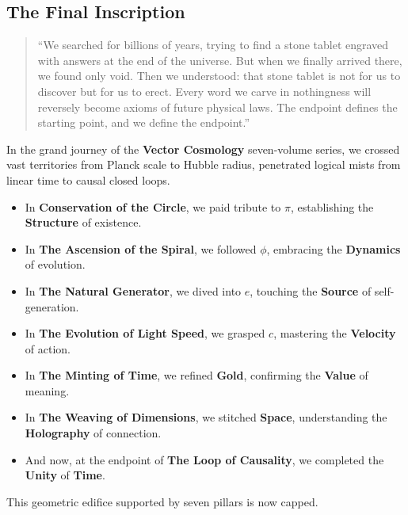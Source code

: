 \subsection{The Final Inscription}

\begin{quote}
``We searched for billions of years, trying to find a stone tablet engraved with answers at the end of the universe. But when we finally arrived there, we found only void. Then we understood: that stone tablet is not for us to discover but for us to erect. Every word we carve in nothingness will reversely become axioms of future physical laws. The endpoint defines the starting point, and we define the endpoint.''
\end{quote}

In the grand journey of the \textbf{Vector Cosmology} seven-volume series, we crossed vast territories from Planck scale to Hubble radius, penetrated logical mists from linear time to causal closed loops.

\begin{itemize}
\item In \textbf{Conservation of the Circle}, we paid tribute to \textbf{$\pi$}, establishing the \textbf{Structure} of existence.

\item In \textbf{The Ascension of the Spiral}, we followed \textbf{$\phi$}, embracing the \textbf{Dynamics} of evolution.

\item In \textbf{The Natural Generator}, we dived into \textbf{$e$}, touching the \textbf{Source} of self-generation.

\item In \textbf{The Evolution of Light Speed}, we grasped \textbf{$c$}, mastering the \textbf{Velocity} of action.

\item In \textbf{The Minting of Time}, we refined \textbf{Gold}, confirming the \textbf{Value} of meaning.

\item In \textbf{The Weaving of Dimensions}, we stitched \textbf{Space}, understanding the \textbf{Holography} of connection.

\item And now, at the endpoint of \textbf{The Loop of Causality}, we completed the \textbf{Unity} of \textbf{Time}.
\end{itemize}

This geometric edifice supported by seven pillars is now capped.

